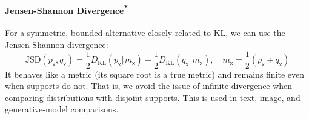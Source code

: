 \paragraph*{\texorpdfstring{Jensen-Shannon Divergence\textsuperscript{*}}{Jensen-Shannon Divergence}} For a symmetric, bounded alternative closely related to KL, we can use the Jensen-Shannon divergence:
\begin{equation}
    \mathrm{JSD}(p_{\mathsf{x}},q_{\mathsf{x}})=\frac12 D_{\mathrm{KL}}(p_{\mathsf{x}}\Vert m_{\mathsf{x}})+\frac12 D_{\mathrm{KL}}(q_{\mathsf{x}}\Vert m_{\mathsf{x}}), \quad m_{\mathsf{x}}=\frac12(p_{\mathsf{x}}+q_{\mathsf{x}})
\end{equation}
It behaves like a metric (its square root is a true metric) and remains finite even when supports do not. That is, we avoid the issue of infinite divergence when comparing distributions with disjoint supports. This is used in text, image, and generative-model comparisons.

